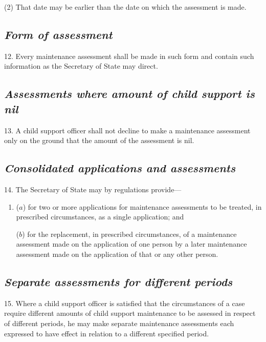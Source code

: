 \documentclass[12pt,a4paper]{article}
\begin{document}
(2) That date may be earlier than the date on which the assessment is made.


\subsection*{\itshape Form of assessment}

12. Every maintenance assessment shall be made in such form and contain such information as the Secretary of State may direct.

\subsection*{\itshape Assessments where amount of child support is nil}

13. A child support officer shall not decline to make a maintenance assessment only on the ground that the amount of the assessment is nil.

\subsection*{\itshape Consolidated applications and assessments}

14. The Secretary of State may by regulations provide—
\begin{enumerate}\item[]
($a$) for two or more applications for maintenance assessments to be treated, in prescribed circumstances, as a single application; and

($b$) for the replacement, in prescribed circumstances, of a maintenance assessment made on the application of one person by a later maintenance assessment made on the application of that or any other person.
\end{enumerate}


\subsection*{\itshape Separate assessments for different periods}

15. Where a child support officer is satisfied that the circumstances of a case require different amounts of child support maintenance to be assessed in respect of different periods, he may make separate maintenance assessments each expressed to have effect in relation to a different specified period.
\end{document}
